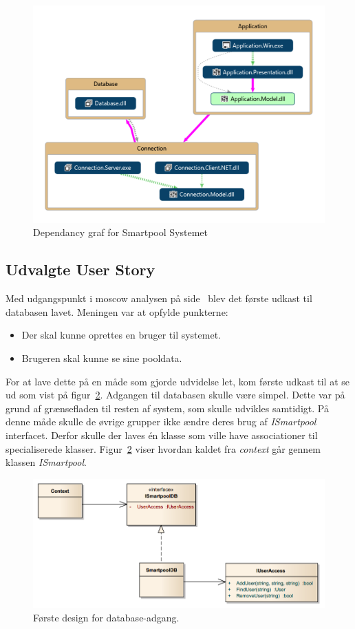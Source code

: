 \begin{figure}[h]
	\centering
	\includegraphics[width=0.8\linewidth]{figs/design/vs_codeMap.PNG}
	\caption{Dependancy graf for Smartpool Systemet}
	\label{fig:vs_codeMap}
\end{figure}

\subsection{Udvalgte User Story}

Med udgangspunkt i \gls{moscow} analysen på side~\pageref{sec:moscow} blev det første udkast til databasen lavet. Meningen var at opfylde punkterne: 

\begin{itemize}
	\item Der skal kunne oprettes en bruger til systemet.
	\item Brugeren skal kunne se sine pooldata.
\end{itemize}

For at lave dette på en måde som gjorde udvidelse let, kom første udkast til at se ud som vist på figur~\ref{fig:database_class_1}. Adgangen til databasen skulle være simpel. Dette var på grund af grænsefladen til resten af system, som skulle udvikles samtidigt. På denne måde skulle de øvrige grupper ikke ændre deres brug af \textit{ISmartpool} interfacet.  Derfor skulle der laves én klasse som ville have associationer til specialiserede klasser. Figur~\ref{fig:database_class_1} viser hvordan kaldet fra \textit{context} går gennem klassen \textit{ISmartpool}.

\begin{figure}[h]
	\centering
	\includegraphics[width=0.9\linewidth]{figs/design/database_class_1}
	\caption{Første design for database-adgang.}
	\label{fig:database_class_1}
\end{figure}

